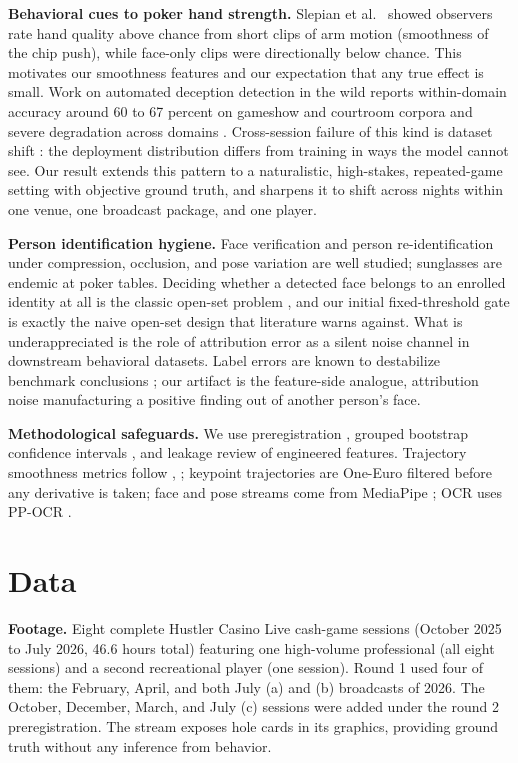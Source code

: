 \documentclass[conference]{IEEEtran}
\begin{document}
\textbf{Behavioral cues to poker hand strength.}
Slepian et al.\ \cite{slepian2013quality} showed observers rate hand quality above chance
from short clips of arm motion (smoothness of the chip push), while
face-only clips were directionally below chance. This motivates our
smoothness features and our expectation that any true effect is small. Work
on automated deception detection in the wild reports within-domain
accuracy around 60 to 67 percent on gameshow and courtroom corpora and
severe degradation across domains \cite{guo2023dolos}. Cross-session
failure of this kind is dataset shift \cite{quinonero2009dataset}: the
deployment distribution differs from training in ways the model cannot
see. Our result extends this pattern to a naturalistic, high-stakes,
repeated-game setting with objective ground truth, and sharpens it to
shift across nights within one venue, one broadcast package, and one
player.

\textbf{Person identification hygiene.} Face verification
\cite{deng2019arcface} and person re-identification \cite{zheng2016person}
under compression, occlusion, and pose variation are well studied;
sunglasses are endemic at poker tables. Deciding whether a detected face
belongs to an enrolled identity at all is the classic open-set problem
\cite{scheirer2013open}, and our initial fixed-threshold gate is exactly
the naive open-set design that literature warns against. What is
underappreciated is the role of attribution error as a silent noise
channel in downstream behavioral datasets. Label errors are known to
destabilize benchmark conclusions \cite{northcutt2021pervasive}; our
artifact is the feature-side analogue, attribution noise manufacturing a
positive finding out of another person's face.

\textbf{Methodological safeguards.} We use preregistration
\cite{nosek2018preregistration}, grouped bootstrap confidence intervals
\cite{efron1993bootstrap}, and leakage review of engineered features.
Trajectory smoothness metrics follow \cite{balasubramanian2015analysis}, \cite{hogan2009sensitivity}; keypoint trajectories are One-Euro
filtered \cite{casiez2012one} before any derivative is taken; face and
pose streams come from MediaPipe \cite{lugaresi2019mediapipe}; OCR uses
PP-OCR \cite{du2020ppocr}.

\section{Data}
\label{sec:pipeline}

\textbf{Footage.} Eight complete Hustler Casino Live cash-game sessions
(October 2025 to July 2026, 46.6 hours total) featuring one high-volume
professional (all eight sessions) and a second recreational player (one
session). Round 1 used four of them: the February, April, and both July
(a) and (b) broadcasts of 2026. The October, December, March, and July
(c) sessions were added under the round 2 preregistration. The stream
exposes hole cards in its graphics, providing ground truth without any
inference from behavior.
\end{document}
